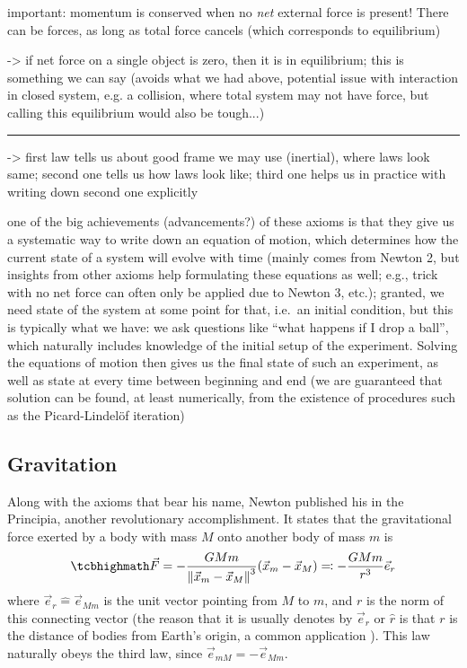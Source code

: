 \documentclass[../class_mech_main.tex]{subfiles}
\begin{document}
important: momentum is conserved when no \emph{net} external force is present! There can be forces, as long as total force cancels (which corresponds to equilibrium)

-> if net force on a single object is zero, then it is in equilibrium; this is something we can say (avoids what we had above, potential issue with interaction in closed system, e.g. a collision, where total system may not have force, but calling this equilibrium would also be tough...)


\hrule


-> first law tells us about good frame we may use (inertial), where laws look same; second one tells us how laws look like; third one helps us in practice with writing down second one explicitly

one of the big achievements (advancements?) of these axioms is that they give us a systematic way to write down an equation of motion, which determines how the current state of a system will evolve with time (mainly comes from Newton 2, but insights from other axioms help formulating these equations as well; e.g., trick with no net force can often only be applied due to Newton 3, etc.); granted, we need state of the system at some point for that, i.e.~an initial condition, but this is typically what we have: we ask questions like \enquote{what happens if I drop a ball}, which naturally includes knowledge of the initial setup of the experiment. Solving the equations of motion then gives us the final state of such an experiment, as well as state at every time between beginning and end (we are guaranteed that solution can be found, at least numerically, from the existence of procedures such as the Picard-Lindelöf iteration)



		\subsection{Gravitation}
Along with the axioms that bear his name, Newton published his  in the Principia, another revolutionary accomplishment. It states that the gravitational force exerted by a body with mass $M$ onto another body of mass $m$ is
\begin{equation}\label{eq:newton_gravitation_law}
	\eqbox{
		\vec{F} = - \frac{G M m}{\norm{\vec{x}_m - \vec{x}_M}^3} (\vec{x}_m - \vec{x}_M) \eqqcolon - \frac{G M m}{r^3} \vec{e}_r
	}
\end{equation}
where $\vec{e}_r \hat{=} \vec{e}_{Mm}$ is the unit vector pointing from $M$ to $m$, and $r$ is the norm of this connecting vector (the reason that it is usually denotes by $\vec{e}_r$ or $\hat{r}$ is that $r$ is the distance of bodies from Earth's origin, a common application ). This law naturally obeys the third law, since $\vec{e}_{mM} = - \vec{e}_{Mm}$.
\end{document}
